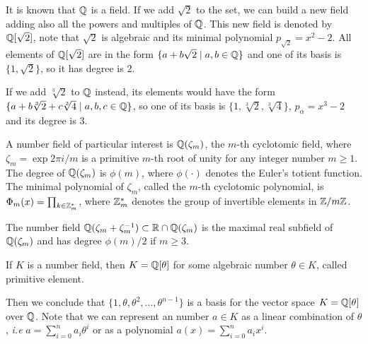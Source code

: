 \documentclass[a4paper,12pt]{article}
\begin{document}
\begin{example}
  It is known that $\mathbb{Q}$ is a field. If we add $\sqrt{2}$ to the set, we
  can build a new field adding also all the powers and multiples of
  $\mathbb{Q}$. This new field is denoted by $\mathbb{Q}[\sqrt{2}]$, note that
  $\sqrt{2}$ is algebraic and its minimal polynomial $p_{\sqrt{2}} = x^2-2$. All
  elements of $\mathbb{Q}[\sqrt{2}]$ are in the form $\{a+b\sqrt{2} \;|\; a,b \in
  \mathbb{Q}\}$ and one of its basis is $\{1, \sqrt{2}\}$, so it has degree is
  $2$.
\end{example}

\begin{example}
  If we add $\sqrt[3]{2}$ to $\mathbb{Q}$ instead, its elements would have the
  form $\{a + b\sqrt[3]{2} + c\sqrt[3]{4} \;|\; a,b,c \in \mathbb{Q}\}$, so one of
  its basis is $\{1 ,\sqrt[3]{2} ,\sqrt[3]{4}\}$, $p_\alpha = x^3 - 2$ and its degree
  is $3$.
\end{example}

\begin{example}\label{example:cyclotomic-number-field}
  A number field of particular interest is $\mathbb{Q}(\zeta_m)$, the $m$-th cyclotomic field,
  where $\zeta_m = \exp{2\pi i /m}$ is a primitive $m$-th root of unity for any
  integer number $m \geq 1$. The degree of $\mathbb{Q}(\zeta_m)$ is $\phi(m)$, where $\phi(\cdot)$
  denotes the Euler’s totient function. The minimal polynomial of $\zeta_m$, called
  the $m$-th cyclotomic polynomial, is $\Phi_m(x) = \prod_{k \in \mathbb{Z}_{m}^*}$, where $\mathbb{Z}^*_m$ denotes the group of invertible elements in $\mathbb{Z}/m\mathbb{Z}$.
\end{example}

\begin{example}
  \label{example:maximal-real-subfield}
  The number field $\mathbb{Q}(\zeta_m + \zeta_m^{-1}) \subset \mathbb{R} \cap \mathbb{Q}(\zeta_m)$ is the maximal real subfield of $\mathbb{Q}(\zeta_m)$ and has degree $\phi(m)/2$ if $m \geq 3$.
\end{example}

\begin{theorem}
   If $K$ is a number field, then $K = \mathbb{Q}[\theta]$ for some
  algebraic number $\theta \in K$, called primitive element.
\end{theorem}

Then we conclude that \(\{1, \theta, \theta^2, ... , \theta^{n-1}\}\) is a basis for the vector
space \(K = \mathbb{Q}[\theta]\) over \(\mathbb{Q}\). Note that we can represent an number \(a \in K\) as a linear combination of \(\theta\), \emph{i.e} \(a = \sum^n_{i=0}{a_i\theta^i}\) or as a polynomial \(a(x) = \sum^n_{i=0}{a_ix^i}\).
\end{document}

